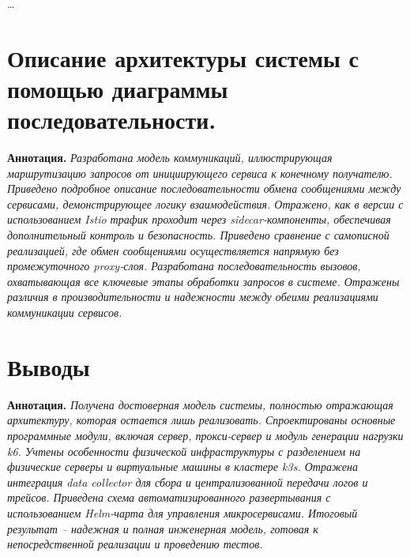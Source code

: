 \dots



\section{Описание архитектуры системы с помощью диаграммы последовательности.}

\textbf{Аннотация.} \textit{Разработана модель коммуникаций, иллюстрирующая маршрутизацию запросов от инициирующего сервиса к конечному получателю. Приведено подробное описание последовательности обмена сообщениями между сервисами, демонстрирующее логику взаимодействия. Отражено, как в версии с использованием Istio трафик проходит через sidecar-компоненты, обеспечивая дополнительный контроль и безопасность. Приведено сравнение с самописной реализацией, где обмен сообщениями осуществляется напрямую без промежуточного proxy-слоя. Разработана последовательность вызовов, охватывающая все ключевые этапы обработки запросов в системе. Отражены различия в производительности и надежности между обеими реализациями коммуникации сервисов.}






\section{Выводы}

\textbf{Аннотация.} \textit{Получена достоверная модель системы, полностью отражающая архитектуру, которая остается лишь реализовать. Спроектированы основные программные модули, включая сервер, прокси-сервер и модуль генерации нагрузки k6. Учтены особенности физической инфраструктуры с разделением на физические серверы и виртуальные машины в кластере k3s. Отражена интеграция data collector для сбора и централизованной передачи логов и трейсов. Приведена схема автоматизированного развертывания с использованием Helm-чарта для управления микросервисами. Итоговый результат – надежная и полная инженерная модель, готовая к непосредственной реализации и проведению тестов.}


